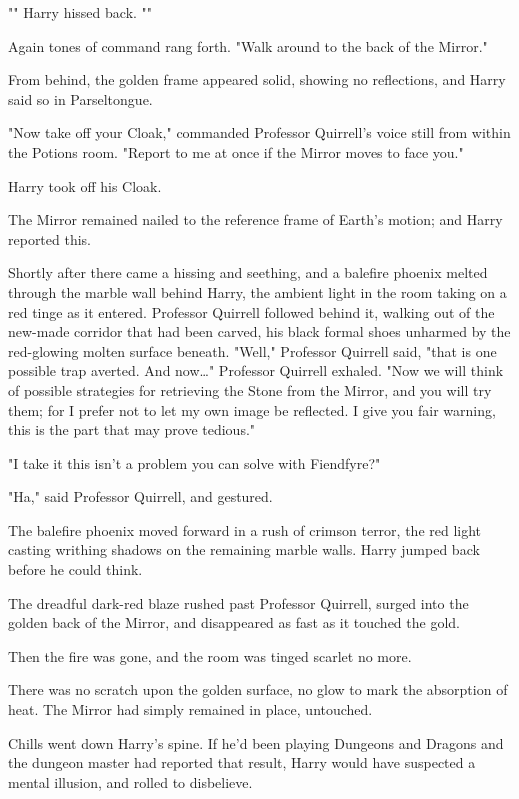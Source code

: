 "" Harry hissed back. ""

Again tones of command rang forth. "Walk around to the back of the Mirror."

From behind, the golden frame appeared solid, showing no reflections, and Harry
said so in Parseltongue.

"Now take off your Cloak," commanded Professor Quirrell's voice still from
within the Potions room. "Report to me at once if the Mirror moves to face you."

Harry took off his Cloak.

The Mirror remained nailed to the reference frame of Earth's motion; and Harry
reported this.

Shortly after there came a hissing and seething, and a balefire phoenix melted
through the marble wall behind Harry, the ambient light in the room taking on a
red tinge as it entered. Professor Quirrell followed behind it, walking out of
the new-made corridor that had been carved, his black formal shoes unharmed by
the red-glowing molten surface beneath. "Well," Professor Quirrell said, "that
is one possible trap averted. And now{\ldots}" Professor Quirrell exhaled. "Now
we will think of possible strategies for retrieving the Stone from the Mirror,
and you will try them; for I prefer not to let my own image be reflected. I
give you fair warning, this is the part that may prove tedious."

"I take it this isn't a problem you can solve with Fiendfyre?"

"Ha," said Professor Quirrell, and gestured.

The balefire phoenix moved forward in a rush of crimson terror, the red light
casting writhing shadows on the remaining marble walls. Harry jumped back
before he could think.

The dreadful dark-red blaze rushed past Professor Quirrell, surged into the
golden back of the Mirror, and disappeared as fast as it touched the gold.

Then the fire was gone, and the room was tinged scarlet no more.

There was no scratch upon the golden surface, no glow to mark the absorption of
heat. The Mirror had simply remained in place, untouched.

Chills went down Harry's spine. If he'd been playing Dungeons and Dragons and
the dungeon master had reported that result, Harry would have suspected a
mental illusion, and rolled to disbelieve.

